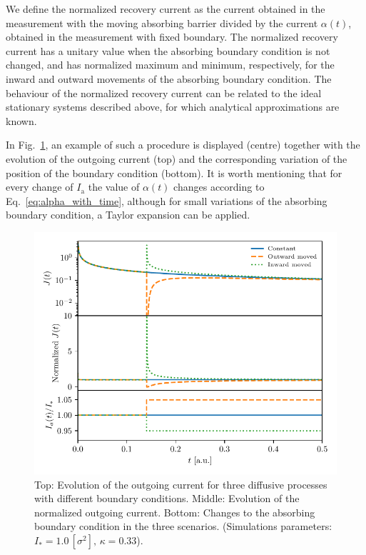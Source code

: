 We define the normalized recovery current as the current obtained in the measurement with the moving absorbing barrier divided by the current $\alpha(t)$, obtained in the measurement with fixed boundary. The normalized recovery current has a unitary value when the absorbing boundary condition is not changed, and has normalized maximum and minimum, respectively, for the inward and outward movements of the absorbing boundary condition. The behaviour of the normalized recovery current can be related to the ideal stationary systems described above, for which analytical approximations are known.

In Fig.~\ref{fig:fixed-vs-moved-boundary}, an example of such a procedure is displayed (centre) together with the evolution of the outgoing current (top) and the corresponding variation of the position of the boundary condition (bottom). It is worth mentioning that for every change of $I_\mathrm{a}$ the value of $\alpha(t)$ changes according to Eq.~\eqref{eq:alpha_with_time}, although for small variations of the absorbing boundary condition, a Taylor expansion can be applied.

\begin{figure}[htp]
    \centering
    \includegraphics[width=\textwidth]{4_probing_the_diffusive_behavior/figs/final/global_vs_moving_current.pdf}
    \caption{Top: Evolution of the outgoing current for three diffusive processes with different boundary conditions. Middle: Evolution of the normalized outgoing current. Bottom: Changes to the absorbing boundary condition in the three scenarios. (Simulations parameters: $I_\ast = 1.0\,[\sigma^2], \, \kappa = 0.33$).}
    \label{fig:fixed-vs-moved-boundary}
\end{figure}

